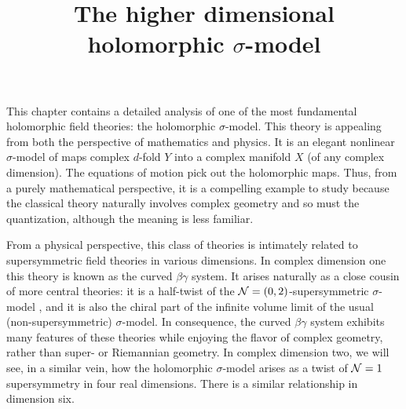 \documentclass[10pt]{amsart}
\title{The higher dimensional holomorphic $\sigma$-model}
\begin{document}
\maketitle
\tableofcontents


This chapter contains a detailed analysis of one of the most fundamental holomorphic field theories: the holomorphic $\sigma$-model.
This theory is appealing from both the perspective of mathematics and physics.
It is an elegant nonlinear $\sigma$-model of maps complex $d$-fold $Y$ into a complex manifold $X$ (of any complex dimension). The equations of motion pick out the holomorphic maps. 
Thus, from a purely mathematical perspective, it is a compelling example to study 
because the classical theory naturally involves complex geometry and so must the quantization, although the meaning is less familiar. 

From a physical perspective, this class of theories is intimately related to supersymmetric field theories in various dimensions.
In complex dimension one this theory is known as the curved $\beta\gamma$ system.
It arises naturally as a close cousin of more central theories: it is a half-twist of the $\mathcal N = (0,2)$-supersymmetric $\sigma$-model \cite{WittenCDO}, and it is also the chiral part of the infinite volume limit of the usual (non-supersymmetric) $\sigma$-model. 
In consequence, the curved $\beta\gamma$ system exhibits many features of these theories while enjoying the flavor of complex geometry, rather than super- or Riemannian geometry.
In complex dimension two, we will see, in a similar vein, how the holomorphic $\sigma$-model arises as a twist of $\mathcal N = 1$ supersymmetry in four real dimensions. 
There is a similar relationship in dimension six.
\end{document}
